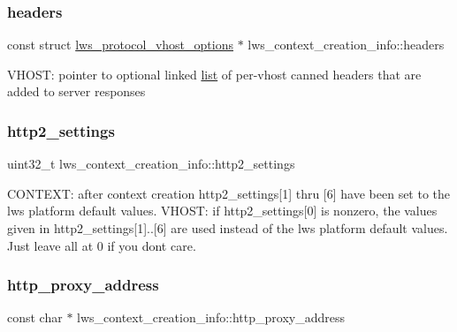 \subsubsection{\texorpdfstring{headers}{headers}}
{\footnotesize\ttfamily const struct \hyperlink{structlws__protocol__vhost__options}{lws\+\_\+protocol\+\_\+vhost\+\_\+options} $\ast$ lws\+\_\+context\+\_\+creation\+\_\+info\+::headers}

V\+H\+O\+ST\+: pointer to optional linked \hyperlink{protocollist-p}{list} of per-\/vhost canned headers that are added to server responses \mbox{\label{structlws__context__creation__info_a763a5795958204e570e8d8a848ad0feb}} 
\subsubsection{\texorpdfstring{http2\+\_\+settings}{http2\_settings}}
{\footnotesize\ttfamily uint32\+\_\+t lws\+\_\+context\+\_\+creation\+\_\+info\+::http2\+\_\+settings}

C\+O\+N\+T\+E\+XT\+: after context creation http2\+\_\+settings\mbox{[}1\mbox{]} thru \mbox{[}6\mbox{]} have been set to the lws platform default values. V\+H\+O\+ST\+: if http2\+\_\+settings\mbox{[}0\mbox{]} is nonzero, the values given in http2\+\_\+settings\mbox{[}1\mbox{]}..\mbox{[}6\mbox{]} are used instead of the lws platform default values. Just leave all at 0 if you don\textquotesingle{}t care. \mbox{\label{structlws__context__creation__info_aafc0e5d17c33f3a4a75df446b46a548b}} 
\subsubsection{\texorpdfstring{http\+\_\+proxy\+\_\+address}{http\_proxy\_address}}
{\footnotesize\ttfamily const char $\ast$ lws\+\_\+context\+\_\+creation\+\_\+info\+::http\+\_\+proxy\+\_\+address}

